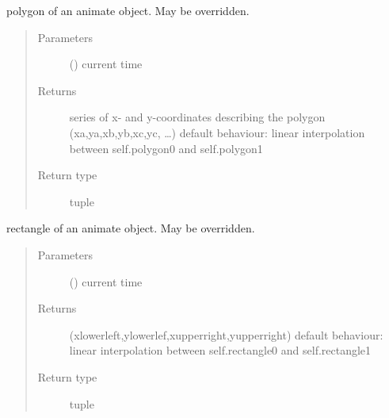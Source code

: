 \documentclass[letterpaper,10pt,english]{sphinxmanual}
\begin{document}
\begin{fulllineitems}
\begin{fulllineitems}
\end{fulllineitems}


\begin{fulllineitems}
\label{\detokenize{Reference:salabim.Animate.polygon}}
polygon of an animate object. May be overridden.
\begin{quote}\begin{description}
\item[{Parameters}] \leavevmode
{} () \textendash{} current time

\item[{Returns}] \leavevmode
{} \textendash{} series of x- and y-coordinates describing the polygon (xa,ya,xb,yb,xc,yc, …) 
default behaviour: linear interpolation between self.polygon0 and self.polygon1

\item[{Return type}] \leavevmode
tuple

\end{description}\end{quote}

\end{fulllineitems}


\begin{fulllineitems}
\label{\detokenize{Reference:salabim.Animate.rectangle}}
rectangle of an animate object. May be overridden.
\begin{quote}\begin{description}
\item[{Parameters}] \leavevmode
{} () \textendash{} current time

\item[{Returns}] \leavevmode
{} \textendash{} (xlowerleft,ylowerlef,xupperright,yupperright) 
default behaviour: linear interpolation between self.rectangle0 and self.rectangle1

\item[{Return type}] \leavevmode
tuple

\end{description}\end{quote}


\end{fulllineitems}
\end{fulllineitems}
\end{document}
